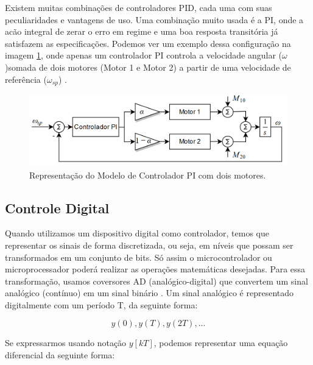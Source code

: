 Existem muitas combinações de controladores PID, cada uma com suas peculiaridades e vantagens de uso. Uma combinação muito usada é a PI, onde a acão integral de zerar o erro em regime e uma boa resposta transitória já satisfazem as especificações. Podemos ver um exemplo dessa configuração na imagem \ref{fig:pi_twomotors_astrom_p308}, onde apenas um controlador PI controla a velocidade angular (\textit{$\omega$})somada de dois motores (Motor 1 e Motor 2) a partir de uma velocidade de referência (\textit{$\omega_{sp}$}) \cite{Astrom1995}.

\begin{figure}[H]
  \caption{Representação do Modelo de Controlador PI com dois motores.}
  \begin{center}
      \includegraphics[scale=0.55]{img/pi_twomotors_astrom_p308}
  \end{center}
  \label{fig:pi_twomotors_astrom_p308}
\end{figure}



\subsection{Controle Digital}

Quando utilizamos um dispositivo digital como controlador, temos que representar os sinais de forma discretizada, ou seja, em níveis que possam ser transformados em um conjunto de bits. Só assim o microcontrolador ou microprocessador poderá realizar as operações matemáticas desejadas. Para essa transformação, usamos coversores AD (analógico-digital) que convertem um sinal analógico (contínuo) em um sinal binário \cite{BongWie2001}. Um sinal analógico é representado digitalmente com um período T, da seguinte forma:

\begin{equation}
  y(0), y(T), y(2T), ...
\end{equation}

Se expressarmos usando notação ${y[kT]}$, podemos representar uma equação diferencial da seguinte forma:

